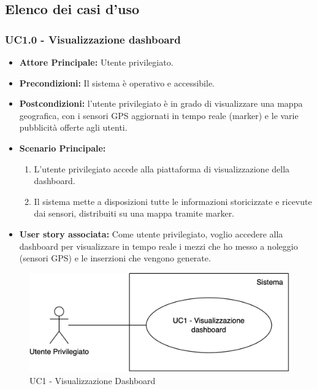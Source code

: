 \documentclass[11pt]{article}
\begin{document}
\begin{justify}
\subsection{Elenco dei casi d'uso}
\subsubsection{\textbf{UC1.0 - Visualizzazione dashboard}}
\begin{itemize}
    \item \textbf{Attore Principale:} Utente privilegiato.
    \item \textbf{Precondizioni:} Il sistema è operativo e accessibile.
    \item \textbf{Postcondizioni:} l'utente privilegiato è in grado di visualizzare una mappa geografica, con i sensori GPS aggiornati in tempo reale (marker) e le varie pubblicità offerte agli utenti.
    \item \textbf{Scenario Principale:}
    \begin{enumerate}
        \item L'utente privilegiato accede alla piattaforma di visualizzazione della dashboard.
        \item Il sistema mette a disposizioni tutte le informazioni storicizzate e ricevute dai sensori, distribuiti su una mappa tramite marker.
    \end{enumerate}
    \item \textbf{User story associata:} Come utente privilegiato, voglio accedere alla dashboard per visualizzare in tempo reale i mezzi che ho messo a noleggio (sensori GPS) e le inserzioni che vengono generate.
    
\end{itemize}
\begin{figure}[ht]
    \centering
    \includegraphics[width=0.5\linewidth]{UC1image.png}
    \caption{UC1 - Visualizzazione Dashboard}
    \label{fig:UC1}
\end{figure}


\end{justify}
\end{document}
